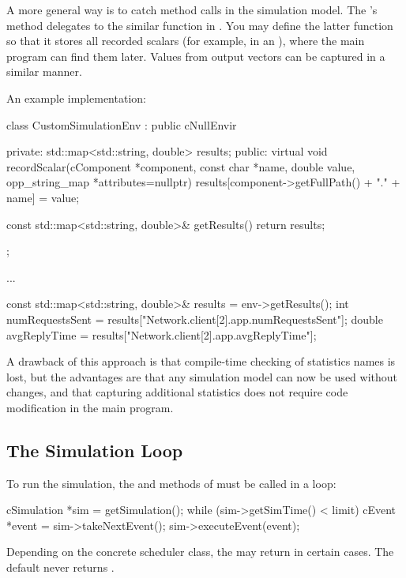 A more general way is to catch  method calls in the
simulation model. The 's  method
delegates to the similar function in . You may define the
latter function so that it stores all recorded scalars (for example, in an
), where the main program can find them later.
Values from output vectors can be captured in a similar manner.

An example implementation:

\begin{cpp}
class CustomSimulationEnv : public cNullEnvir
{
  private:
    std::map<std::string, double> results;
  public:
    virtual void recordScalar(cComponent *component, const char *name,
                              double value, opp_string_map *attributes=nullptr)
    {
       results[component->getFullPath() + "." + name] = value;
    }

    const std::map<std::string, double>& getResults() {return results;}
};

...

const std::map<std::string, double>& results = env->getResults();
int numRequestsSent = results["Network.client[2].app.numRequestsSent"];
double avgReplyTime = results["Network.client[2].app.avgReplyTime"];
\end{cpp}

A drawback of this approach is that compile-time checking of statistics names is lost, but
the advantages are that any simulation model can now be used
without changes, and that capturing additional statistics does not require
code modification in the main program.


\subsection{The Simulation Loop}
\label{sec:embedding:simulation-loop}

To run the simulation, the  and 
methods of  must be called in a loop:

\begin{cpp}
cSimulation *sim = getSimulation();
while (sim->getSimTime() < limit) {
    cEvent *event = sim->takeNextEvent();
    sim->executeEvent(event);
}
\end{cpp}

Depending on the concrete scheduler class, the 
may return  in certain cases. The default
 never returns .

